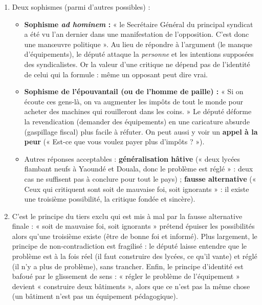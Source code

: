 \documentclass[11pt]{article}
\newcommand{\cle}[1]{{\popxbold\color{popdark}#1}}
\begin{document}
\begin{corrige}
\begin{enumerate}
    \item Deux sophismes (parmi d'autres possibles) :
    \begin{itemize}
        \item \textbf{Sophisme \emph{ad hominem} :} « le Secrétaire Général du principal syndicat a été vu l'an dernier dans une manifestation de l'opposition. C'est donc une manœuvre politique ». Au lieu de répondre à l'argument (le manque d'équipements), le député attaque la \emph{personne} et les intentions supposées des syndicalistes. Or la valeur d'une critique ne dépend pas de l'identité de celui qui la formule : même un opposant peut dire vrai.
        \item \textbf{Sophisme de l'épouvantail (ou de l'homme de paille) :} « Si on écoute ces gens-là, on va augmenter les impôts de tout le monde pour acheter des machines qui rouilleront dans les coins. » Le député déforme la revendication (demander des équipements) en une caricature absurde (gaspillage fiscal) plus facile à réfuter. On peut aussi y voir un \textbf{appel à la peur} (« Est-ce que vous voulez payer plus d'impôts ? »).
        \item Autres réponses acceptables : \textbf{généralisation hâtive} (« deux lycées flambant neufs à Yaoundé et Douala, donc le problème est réglé » : deux cas ne suffisent pas à conclure pour tout le pays) ; \textbf{fausse alternative} (« Ceux qui critiquent sont soit de mauvaise foi, soit ignorants » : il existe une troisième possibilité, la critique fondée et sincère).
    \end{itemize}
    \item C'est le \cle{principe du tiers exclu} qui est mis à mal par la fausse alternative finale : « soit de mauvaise foi, soit ignorants » prétend épuiser les possibilités alors qu'une troisième existe (être de bonne foi et informé). Plus largement, le principe de \cle{non-contradiction} est fragilisé : le député laisse entendre que le problème est à la fois réel (il faut construire des lycées, ce qu'il vante) et réglé (il n'y a plus de problème), sans trancher. Enfin, le \cle{principe d'identité} est bafoué par le glissement de sens : « régler le problème de l'équipement » devient « construire deux bâtiments », alors que ce n'est pas la même chose (un bâtiment n'est pas un équipement pédagogique).

\end{enumerate}
\end{corrige}
\end{document}

